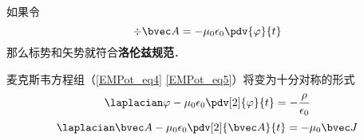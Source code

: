 

如果令
\begin{equation}
\div \bvec A = -\mu_0 \epsilon_0 \pdv{\varphi}{t}
\end{equation}
那么标势和矢势就符合\textbf{洛伦兹规范}． 

麦克斯韦方程组（\autoref{EMPot_eq4} \autoref{EMPot_eq5}）将变为十分对称的形式
\begin{equation}
\laplacian \varphi - \mu_0\epsilon_0 \pdv[2]{\varphi}{t} = -\frac{\rho}{\epsilon_0}
\end{equation}
\begin{equation}
\laplacian \bvec A - \mu_0\epsilon_0 \pdv[2]{\bvec A}{t} = -\mu_0 \bvec J
\end{equation}
